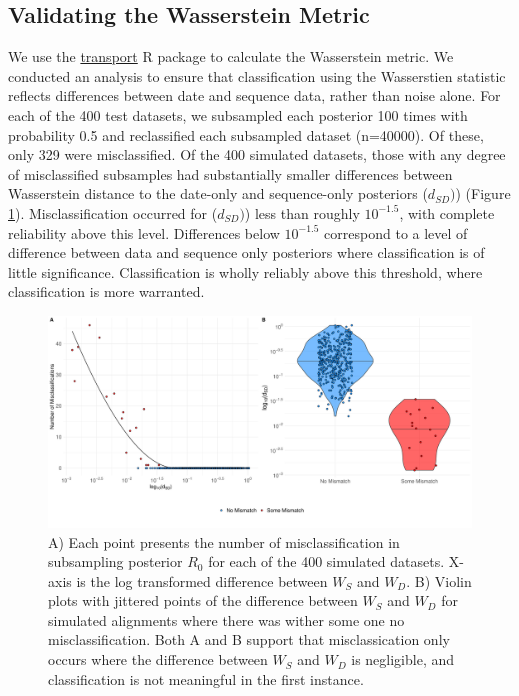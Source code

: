 \documentclass{article}
\begin{document}
\subsection*{Validating the Wasserstein Metric}
We use the \href{https://www.rdocumentation.org/packages/transport/versions/0.12-2/topics/wasserstein1d}{transport} R package to calculate the Wasserstein metric. We conducted an analysis to ensure that classification using the Wasserstien statistic reflects differences between date and sequence data, rather than noise alone. For each of the 400 test datasets, we subsampled each posterior 100 times with probability 0.5 and reclassified each subsampled dataset (n=40000). Of these, only 329 were misclassified. Of the 400 simulated datasets, those with any degree of misclassified subsamples had substantially smaller differences between Wasserstein distance to the date-only and sequence-only posteriors ($d_{SD})$) (Figure \ref{fig:validateW}). Misclassification occurred for ($d_{SD})$) less than roughly $10^{-1.5}$, with complete reliability above this level. Differences below $10^{-1.5}$ correspond to a level of difference between data and sequence only posteriors where classification is of little significance. Classification is wholly reliably above this threshold, where classification is more warranted.

\renewcommand{\thefigure}{S\arabic{figure}}
\setcounter{figure}{0}

\begin{figure}[H]
\centering
\includegraphics[width=1\linewidth]{figures/errorWasserstein.pdf}
\caption{A) Each point presents the number of misclassification in subsampling posterior $R_0$ for each of the 400 simulated datasets. X-axis is the log transformed difference between $W_S$ and $W_D$. B) Violin plots with jittered points of the difference between $W_S$ and $W_D$ for simulated alignments where there was wither some one no misclassification. Both A and B support that misclassication only occurs where the difference between $W_S$ and $W_D$ is negligible, and classification is not meaningful in the first instance.}
\label{fig:validateW}
\end{figure}
\end{document}
